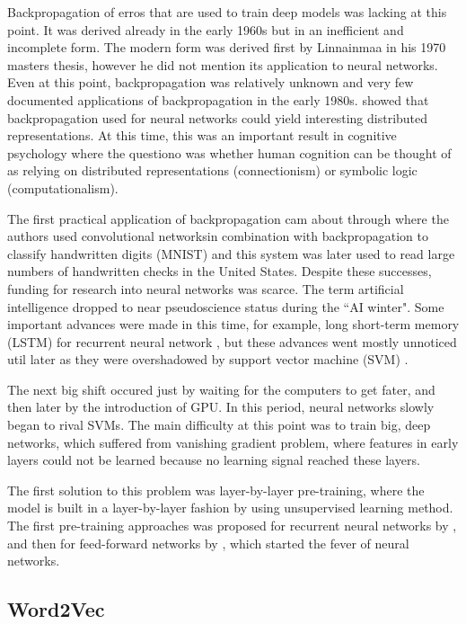 Backpropagation of erros that are used to train deep models was lacking at this point. It was derived already in the early 1960s but in an inefficient and incomplete form. The modern form was derived first by Linnainmaa in his 1970 masters thesis, however he did not mention its application to neural networks. Even at this point, backpropagation was relatively unknown and very few documented applications of backpropagation in the early 1980s. \cite{rumelhart1988learning} showed that backpropagation used for neural networks could yield interesting distributed representations. At this time, this was an important result in cognitive psychology where the questiono was whether human cognition can be thought of as relying on distributed representations (connectionism) or symbolic logic (computationalism).

The first practical application of backpropagation cam about through \cite{lecun1989backpropagation} where the authors used convolutional networksin combination with backpropagation to classify handwritten digits (MNIST) and this system was later used to read large numbers of handwritten checks in the United States. Despite these successes, funding for research into neural networks was scarce. The term artificial intelligence dropped to near pseudoscience status during the ``AI winter". Some important advances were made in this time, for example, long short-term memory (LSTM) for recurrent neural network \cite{hochreiter1997long}, but these advances went mostly unnoticed util later as they were overshadowed by support vector machine (SVM) \cite{cortes1995support}.

The next big shift occured just by waiting for the computers to get fater, and then later by the introduction of GPU. In this period, neural networks slowly began to rival SVMs. The main difficulty at this point was to train big, deep networks, which suffered from vanishing gradient problem, where features in early layers could not be learned because no learning signal reached these layers.

The first solution to this problem was layer-by-layer pre-training, where the model is built in a layer-by-layer fashion by using unsupervised learning method. The first pre-training approaches was proposed for recurrent neural networks by \cite{schmidhuber1992learning}, and then for feed-forward networks by \cite{hinton2006reducing}, which started the fever of neural networks.

\subsection{Word2Vec}

